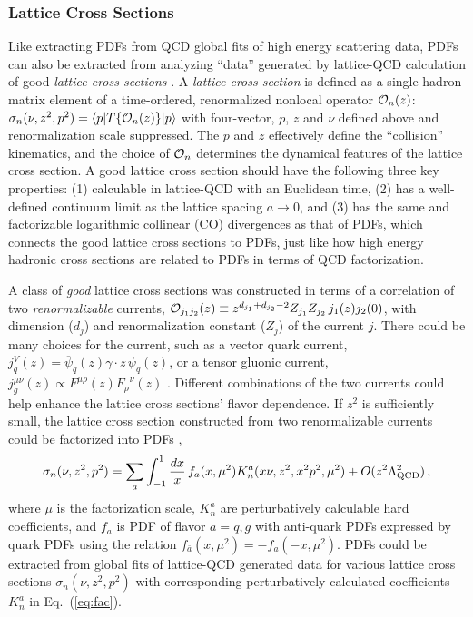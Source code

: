 \subsubsection{Lattice Cross Sections}
Like extracting PDFs from QCD global fits of high energy scattering data, PDFs can also be extracted from analyzing ``data'' generated by lattice-QCD calculation of good {\it lattice cross sections} \cite{Ma:2014jla,Ma:2014jga}. A {\it lattice cross section} is defined as a single-hadron matrix element of a time-ordered, renormalized nonlocal operator ${\cal O}_n(z)$: ${\sigma}_{n}(\nu,z^2,p^2)=\langle p| {T}\{{\cal O}_n({z})\}|p\rangle$ with four-vector, $p$, $z$ and $\nu$ defined above and renormalization scale suppressed. The $p$ and $z$ effectively define the ``collision'' kinematics, and the choice of ${\cal O}_n$ determines the dynamical features of the lattice cross section. A good lattice cross section should have the following three key properties: (1) calculable in lattice-QCD with an Euclidean time, (2) has a well-defined continuum limit as the lattice spacing $a\to 0$, and (3) has the same and factorizable logarithmic collinear (CO) divergences as that of PDFs, which connects the good lattice cross sections to PDFs, just like how high energy hadronic cross sections are related to PDFs in terms of QCD factorization.  

A class of {\it good} lattice cross sections was constructed in terms of a correlation of two {\it renormalizable} currents, ${\cal O}_{j_1j_2}(z)\equiv z^{d_{j_1}+d_{j_2}-2} Z_{j_1} Z_{j_2}\, j_1(z) j_2(0)$, with dimension ($d_j$) and renormalization constant ($Z_j$) of the current $j$.  There could be many choices for the current, such as a vector quark current, $j_q^V(z) = \overline{\psi}_q(z)\gamma\cdot{z}\, {\psi}_{q}(z)$, or a tensor gluonic current, $j_g^{\mu\nu}(z)\propto F^{\mu\rho}(z){F_{\rho}}^\nu(z)$ \cite{Ma:2017pxb}.  Different combinations of the two currents could help enhance the lattice cross sections' flavor dependence.  If $z^2$ is sufficiently small, the lattice cross section constructed from two renormalizable currents could be factorized into PDFs \cite{Ma:2017pxb},
\begin{equation}\label{eq:fac}
{\sigma}_{n}(\nu,z^2,p^2)=\sum_{a}\int_{-1}^1 \frac{dx}{x}\, f_{a}(x,\mu^2) 
K_{{n}}^{a}(x\nu,z^2,x^2p^2,\mu^2) +O(z^2\Lambda_{\rm QCD}^2)\, ,
\end{equation}
where $\mu$ is the factorization scale, $K_n^{a}$ are perturbatively calculable hard coefficients, and $f_{a}$ is PDF of flavor $a=q,g$ with anti-quark PDFs expressed by quark PDFs using the relation $f_{\bar{a}}(x,\mu^2)=-f_{{a}}(-x,\mu^2)$.  PDFs could be extracted from global fits of lattice-QCD generated data for various lattice cross sections $\sigma_{n}(\nu,z^2,p^2)$ with corresponding perturbatively calculated coefficients $K_n^{a}$ in Eq.~(\ref{eq:fac}).

